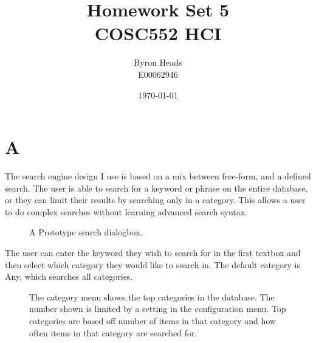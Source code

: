\documentclass[12pt]{report}
\title{Homework Set 5 \\
    COSC552 HCI}
\author{ Byron Heads \\
    E00062946 }
\date{\today}
\begin{document}
\maketitle

\chapter*{A}

The search engine design I use is based on a mix between free-form, and 
a defined search.  The user is able to search for a keyword or phrase
on the entire database, or they can limit their results by searching only
in a category.  This allows a user to do complex searches without learning
advanced search syntax.

\begin{figure}[h!]
\caption{A Prototype search dialogbox.}
\end{figure}

The user can enter the keyword they wish to search for in the first textbox
and then select which category they would like to search in.  The default
category is Any, which searches all categories.

\begin{figure}[h!]
\caption{The category menu shows the top categories in the database.  The
number shown is limited by a setting in the configuration menu.  Top 
categories are based off number of items in that category and how often
items in that category are searched for.}
\end{figure}
\end{document}
